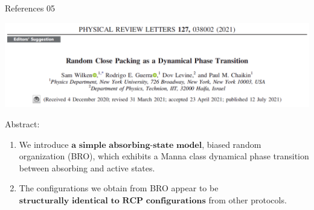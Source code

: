 \documentclass{bredelebeamer}
\begin{document}
\begin{frame}{References 05}
\centerline{\includegraphics[scale=0.2]{images/p5.png}}
Abstract:
\begin{enumerate}[]
\item We introduce $\textbf{a simple absorbing-state model}$, biased random organization (BRO), which
exhibits a Manna class dynamical phase transition between absorbing and active states.
\item The configurations we obtain from BRO appear to be $\textbf{structurally identical to RCP configurations}$ from
other protocols.
\end{enumerate}
\end{frame}
\end{document}
